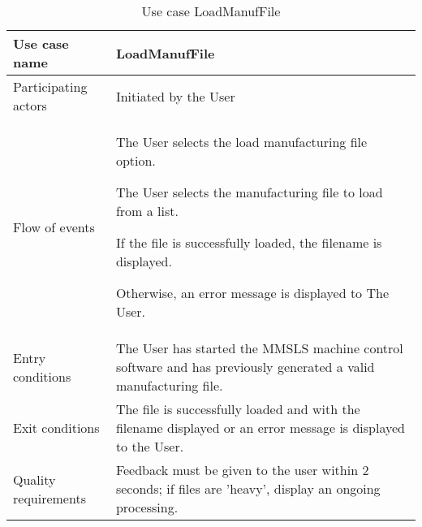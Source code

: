 \begin{table}
  \captionsetup{justification=raggedright, singlelinecheck=false}
  \caption{Use case LoadManufFile}
  \centering
  \begin{tabular}{p{}p{}}
    \hline
    Use case name & \textbf{LoadManufFile} \\ \hline
     Participating actors      & Initiated by the User \\ \hline
     Flow of events & \begin{enum-c}
     \item The User selects the load manufacturing file option.
     \item The User selects the manufacturing file to load from a list.
     \item If the file is successfully loaded, the filename is displayed.
     \item Otherwise, an error message is displayed to The User.
     \end{enum-c}\\ \hline 
     Entry conditions       & The User has started the MMSLS machine control
     software and has previously generated a valid manufacturing file. \\ \hline 
      Exit conditions & The file is successfully loaded and with the
      filename displayed or an error message is displayed to the User.      \\ \hline 
      Quality requirements & Feedback must be given to the user within 2
      seconds; if files are 'heavy', display an ongoing processing. \\ \hline 
  \end{tabular}
\label{tab:us-load-manuf}
\end{table}

